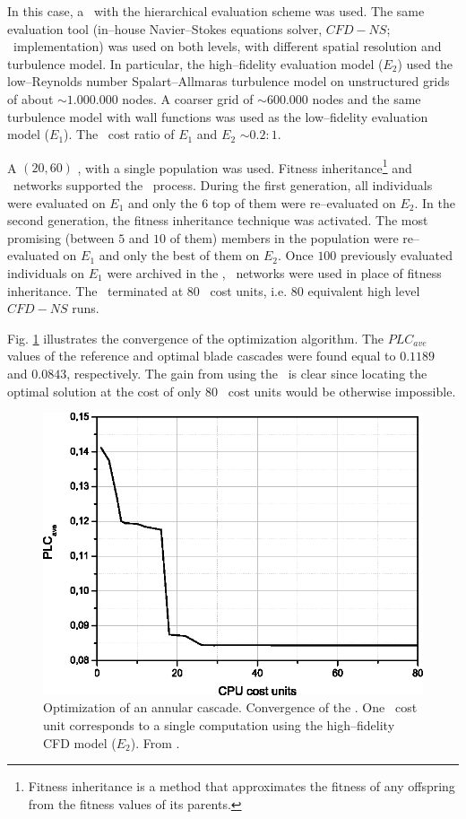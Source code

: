 \documentclass{vki_ls}
\begin{document}
In this case, a \HMAEA\ with the hierarchical evaluation scheme was used.
The same evaluation tool (in--house Navier--Stokes equations solver, $CFD\!-\!NS$; \CPU\ implementation) was used on both levels, with different spatial resolution and turbulence model. 
In particular, the high--fidelity evaluation model ($E_2$) used the low--Reynolds number Spalart--Allmaras \cite{Spa94} turbulence model on unstructured grids of about $\sim\!1.000.000$ nodes. 
A coarser grid of $\sim\!600.000$ nodes and the same turbulence model with wall functions was used as the low--fidelity evaluation model ($E_1$).
The \CPU\ cost ratio of $E_1$ and $E_2$  $\sim\!0.2:1$.

A $(20,60)$ \HMAEA, with a single population was used.
Fitness inheritance\footnote{Fitness inheritance is a method that approximates the fitness of any offspring from the fitness values of its parents.} and \RBF\ networks supported the \IPE\ process.
During the first generation, all individuals were evaluated on $E_1$
and only the $6$ top of them were re--evaluated on $E_2$. 
In the second generation, the fitness inheritance technique was activated.
The most promising (between $5$ and $10$ of them) members in the
population were re--evaluated on $E_1$ and only the best of them on
$E_2$. Once $100$ previously evaluated individuals on $E_1$ were
archived in the \DB, \RBF\ networks were used in place of fitness
inheritance. 
The \HMAEA\ terminated at $80$ \CPU\ cost units, i.e. $80$ equivalent high level $CFD\!-\!NS$ runs.

Fig. \ref{hmaeas:ntua_blade} illustrates the convergence of the optimization algorithm. The $PLC_{ave}$ values of the reference and optimal blade cascades were found equal to $0.1189$ and $0.0843$, respectively. 
The gain from using the \HMAEA\ is clear since locating the optimal solution at the cost of only $80$ \CPU\ cost units would be otherwise impossible.

\begin{figure}[ht!]
    \centering
    \includegraphics[scale=0.7]{hmaeas/ntua_res.eps}
    \caption{Optimization of an annular cascade. Convergence of the \HMAEA. 
	     One \CPU\ cost unit corresponds to a single computation using the
	     high--fidelity CFD model ($E_2$). From \cite{LTT_4_05}.}
    \label{hmaeas:ntua_blade}
\end{figure}
\end{document}
